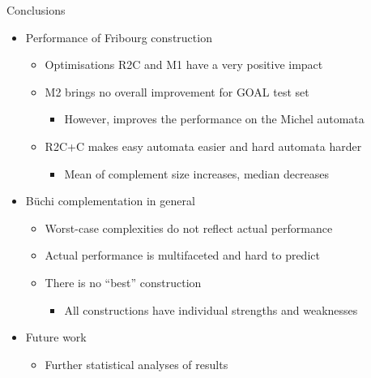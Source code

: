 \documentclass[12pt]{beamer}
\begin{document}
\begin{frame}{Conclusions}
\begin{itemize}\itemsep4pt
\item Performance of Fribourg construction
  \begin{itemize}\itemsep3pt\vspace{-0.5mm}
  \item Optimisations R2C and M1 have a very positive impact
  \item M2 brings no overall improvement for GOAL test set
    \begin{itemize}\vspace{-0.5mm}
    \item However, improves the performance on the Michel automata
    \end{itemize}
  \item R2C+C makes easy automata easier and hard automata harder
    \begin{itemize}\vspace{-0.5mm}
    \item Mean of complement size increases, median decreases
    \end{itemize}
  \end{itemize}
\pause
\item Büchi complementation in general
  \begin{itemize}\itemsep3pt\vspace{-0.5mm}
  \item Worst-case complexities do not reflect actual performance\vspace{-0.5mm}
  \item Actual performance is multifaceted and hard to predict
  \item There is no ``best'' construction
    \begin{itemize}\vspace{-0.5mm}
    \item All constructions have individual strengths and weaknesses
    \end{itemize}
  \end{itemize}
\pause
\item Future work
  \begin{itemize}\vspace{-0.5mm}
  \item Further statistical analyses of results
  \end{itemize}
\end{itemize}
\end{frame}
\end{document}
